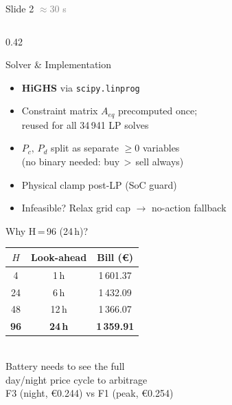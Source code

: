 \documentclass[aspectratio=169, 10pt]{beamer}
\begin{document}
\begin{frame}{Slide 2 \hfill \textcolor{gray}{\small$\approx$30 s}}
\begin{columns}[T]
    \begin{column}{0.42\textwidth}
      \begin{block}{Solver \& Implementation}
        \small
        \begin{itemize}
          \item \textbf{HiGHS} via \texttt{scipy.linprog}
          \item Constraint matrix $A_{eq}$ precomputed once;\\
                reused for all 34\,941 LP solves
          \item $P_c,\,P_d$ split as separate $\geq0$ variables\\
                (no binary needed: buy\,$>$\,sell always)
          \item Physical clamp post-LP (SoC guard)
          \item Infeasible? Relax grid cap $\rightarrow$ no-action fallback
        \end{itemize}
      \end{block}

      \vspace{4pt}
      \begin{block}{Why H\,=\,96 (24\,h)?}
        \renewcommand{\arraystretch}{1.15}
        \small
        \begin{tabular}{ccc}
          \toprule
          $H$ & Look-ahead & Bill (\euro) \\
          \midrule
          4   & 1\,h  & 1\,601.37 \\
          24  & 6\,h  & 1\,432.09 \\
          48  & 12\,h & 1\,366.07 \\
          \rowcolor{solaryellow!30}
          \textbf{96} & \textbf{24\,h} & \textbf{1\,359.91} \\
          \bottomrule
        \end{tabular}\\[4pt]
        \footnotesize Battery needs to see the full\\
        day/night price cycle to arbitrage\\
        F3 (night, \euro0.244) vs F1 (peak, \euro0.254)
      \end{block}
    \end{column}
  \end{columns}
\end{frame}
\end{document}
